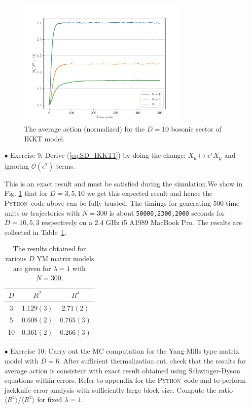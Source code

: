 \documentclass[letter,11pt]{article}
\newcommand{\PY}{\textsc{Python}}
\begin{document}
\begin{figure}[htbp] 
	\centering 
	\includegraphics[width=0.75\textwidth]{figs/act_allD_YM.pdf}
	\caption{\label{fig:IKKT_2}The average action (normalized) for the $D=10$ bosonic sector of IKKT model.}
\end{figure}

\begin{mdframed}[backgroundcolor=blue!3] 
	\textsc{} 
	$\bullet$ Exercise 9: Derive (\ref{eq:SD_IKKT1}) by doing the change: $X_{\mu} \mapsto e^{\epsilon}X_{\mu}$ and ignoring 
	$\mathcal{O}(\epsilon^{2})$ terms.
\end{mdframed}
This is an exact result and must be satisfied during the simulation.We show in Fig. \ref{fig:IKKT_2} that for $D=3,5,10$ we get this expected result and hence the \PY~code above can be fully trusted. The timings for generating 500 time units or trajectories 
with $N=300$ is about \texttt{50000,2300,2000} seconds for $D = 10, 5, 3$ respectively on 
a 2.4 GHz i5 A1989 MacBook Pro. The results are collected in Table~\ref{table:D_IKKT_data}. 
\begin{table}[h!]
	\centering
	\begin{tabular}{||c c c||} 
		\hline
		$D$ & $R^2$ & $R^4$ \\ [0.5ex] 
		\hline\hline
		3 & $1.129(3) $ & $2.71(2) $  \\ 
		5 & $0.608(2) $ & $0.765(3) $  \\
		10 & $0.361(2)$ & $0.266(3)$
		 \\ [1ex] 
		\hline 
	\end{tabular}
\caption{The results obtained for various $D$ YM matrix models are given for $\lambda=1$ with $N=300$.}
\label{table:D_IKKT_data}
\end{table}

\begin{mdframed}[backgroundcolor=blue!3] 
	\textsc{} 
	$\bullet$ Exercise 10: Carry out the MC computation for the Yang-Mills type matrix model with $D=6$. After sufficient thermalization cut, check that the results for average action is consistent with exact result obtained using Schwinger-Dyson equations within errors. Refer to appendix for the \PY~code and to perform jackknife error analysis with sufficiently large block size. Compute the ratio $\langle R^4 \rangle / \langle R^2 \rangle$ for fixed $\lambda=1$. 
\end{mdframed} 
\end{document}
